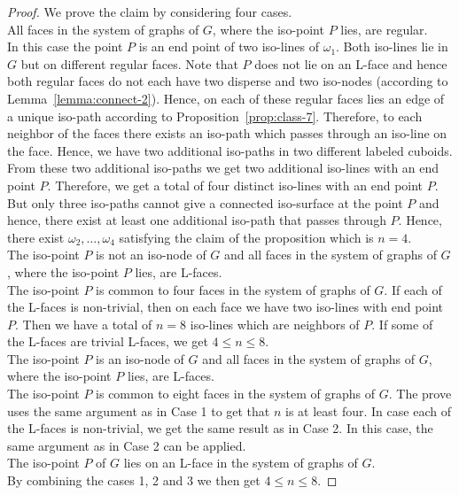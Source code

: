 \documentclass[a4paper,11pt]{article}
\begin{document}
\begin{proof}
We prove the claim by considering four cases. \\

All faces in the system of graphs of $G$, where the iso-point $P$ lies, are regular.\\

\noindent In this case the point $P$ is an end point of two iso-lines of $\omega_1$. Both iso-lines
lie in $G$ but on different regular faces. Note that $P$ does not lie on an L-face and hence both
regular faces do not each have two disperse and two iso-nodes (according to Lemma~\ref{lemma:connect-2}).
Hence, on each of these regular faces lies an edge of a unique iso-path according to
Proposition~\ref{prop:class-7}. Therefore, to each neighbor of the faces there exists an iso-path
which passes through an iso-line on the face. Hence, we have two additional iso-paths in two different
labeled cuboids. From these two additional iso-paths we get two additional iso-lines with an end point
$P$. Therefore, we get a total of four distinct iso-lines with an end point $P$. But only three
iso-paths cannot give a connected iso-surface at the point $P$ and hence, there exist at least one
additional iso-path that passes through $P$. Hence, there exist $\omega_2,\ldots,\omega_4$ satisfying
the claim of the proposition which is $n=4$.\\

The iso-point $P$ is not an iso-node of $G$ and all faces in the system of
graphs of $G$, where the iso-point $P$ lies, are L-faces.\\

\noindent The iso-point $P$ is common to four faces in the system of graphs of $G$. If each of the
L-faces is non-trivial, then on each face we have two iso-lines with end point $P$. Then we have a
total of $n=8$  iso-lines which are neighbors of $P$. If some of the L-faces are trivial L-faces,
we get $4\leq n\leq 8$.\\

The iso-point $P$ is an iso-node of $G$ and all faces in the system of graphs
of $G$, where the iso-point $P$ lies, are L-faces.\\

\noindent The iso-point $P$ is common to eight faces in the system of graphs of $G$. The prove uses
the same argument as in Case 1 to get that $n$ is at least four. In case each of the L-faces is non-trivial,
we get the same result as in Case 2. In this case, the same argument as in Case 2 can be applied.\\

The iso-point $P$ of $G$ lies on an L-face in the system of graphs of $G$.\\

\noindent By combining the cases 1, 2 and 3 we then get $4\leq n\leq 8$.
\end{proof}
\end{document}
